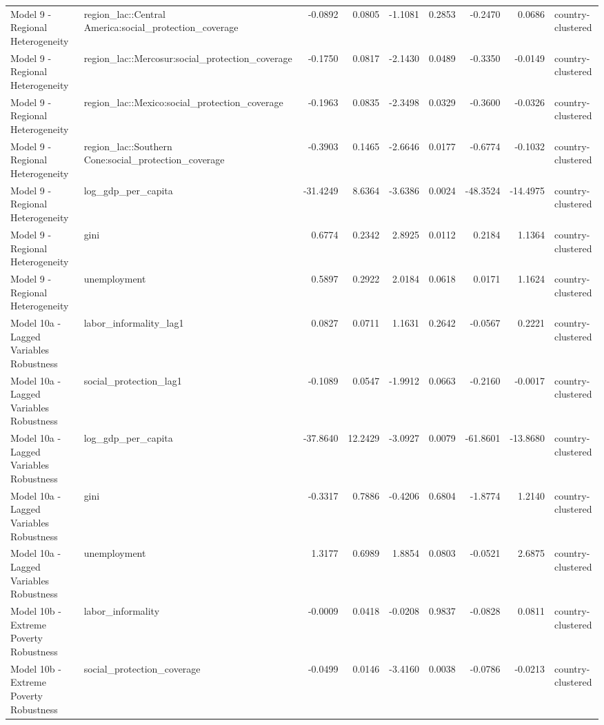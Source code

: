 \begin{tabular}{llrrrrrrl}
Model 9 - Regional Heterogeneity & region\_lac::Central America:social\_protection\_coverage & -0.0892 & 0.0805 & -1.1081 & 0.2853 & -0.2470 & 0.0686 & country-clustered\\
\addlinespace
Model 9 - Regional Heterogeneity & region\_lac::Mercosur:social\_protection\_coverage & -0.1750 & 0.0817 & -2.1430 & 0.0489 & -0.3350 & -0.0149 & country-clustered\\
Model 9 - Regional Heterogeneity & region\_lac::Mexico:social\_protection\_coverage & -0.1963 & 0.0835 & -2.3498 & 0.0329 & -0.3600 & -0.0326 & country-clustered\\
Model 9 - Regional Heterogeneity & region\_lac::Southern Cone:social\_protection\_coverage & -0.3903 & 0.1465 & -2.6646 & 0.0177 & -0.6774 & -0.1032 & country-clustered\\
Model 9 - Regional Heterogeneity & log\_gdp\_per\_capita & -31.4249 & 8.6364 & -3.6386 & 0.0024 & -48.3524 & -14.4975 & country-clustered\\
Model 9 - Regional Heterogeneity & gini & 0.6774 & 0.2342 & 2.8925 & 0.0112 & 0.2184 & 1.1364 & country-clustered\\
\addlinespace
Model 9 - Regional Heterogeneity & unemployment & 0.5897 & 0.2922 & 2.0184 & 0.0618 & 0.0171 & 1.1624 & country-clustered\\
Model 10a - Lagged Variables Robustness & labor\_informality\_lag1 & 0.0827 & 0.0711 & 1.1631 & 0.2642 & -0.0567 & 0.2221 & country-clustered\\
Model 10a - Lagged Variables Robustness & social\_protection\_lag1 & -0.1089 & 0.0547 & -1.9912 & 0.0663 & -0.2160 & -0.0017 & country-clustered\\
Model 10a - Lagged Variables Robustness & log\_gdp\_per\_capita & -37.8640 & 12.2429 & -3.0927 & 0.0079 & -61.8601 & -13.8680 & country-clustered\\
Model 10a - Lagged Variables Robustness & gini & -0.3317 & 0.7886 & -0.4206 & 0.6804 & -1.8774 & 1.2140 & country-clustered\\
\addlinespace
Model 10a - Lagged Variables Robustness & unemployment & 1.3177 & 0.6989 & 1.8854 & 0.0803 & -0.0521 & 2.6875 & country-clustered\\
Model 10b - Extreme Poverty Robustness & labor\_informality & -0.0009 & 0.0418 & -0.0208 & 0.9837 & -0.0828 & 0.0811 & country-clustered\\
Model 10b - Extreme Poverty Robustness & social\_protection\_coverage & -0.0499 & 0.0146 & -3.4160 & 0.0038 & -0.0786 & -0.0213 & country-clustered\\

\end{tabular}

